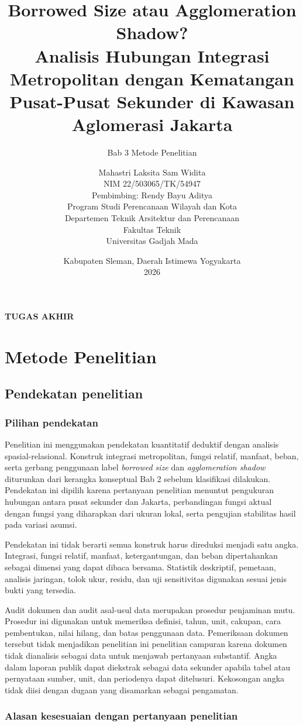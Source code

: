 \documentclass[11pt,a4paper,oneside,openany,indonesian]{report}
\title{\textbf{Borrowed Size atau Agglomeration Shadow?}\\[0.4em]
Analisis Hubungan Integrasi Metropolitan dengan Kematangan Pusat-Pusat Sekunder di Kawasan Aglomerasi Jakarta}
\subtitle{Bab 3 Metode Penelitian}
\author{Mahastri Laksita Sam Widita\\NIM 22/503065/TK/54947\\[0.5em]
Pembimbing: Rendy Bayu Aditya\\[0.5em]
Program Studi Perencanaan Wilayah dan Kota\\
Departemen Teknik Arsitektur dan Perencanaan\\
Fakultas Teknik\\
Universitas Gadjah Mada}
\date{Kabupaten Sleman, Daerah Istimewa Yogyakarta\\2026}
\makeatletter
\renewcommand{\maketitle}{%
  \begin{titlepage}
    \centering
    {\Large\bfseries TUGAS AKHIR\par}
    \vfill
    {\LARGE\bfseries \@title\par}
    \vspace{1.2cm}
    {\large \thesubtitle\par}
    \vfill
    {\large \@author\par}
    \vfill
    {\large \@date\par}
  \end{titlepage}}
\makeatother
\begin{document}
\maketitle
\tableofcontents
\clearpage
\setcounter{chapter}{2}
\chapter{Metode Penelitian}
\section{Pendekatan penelitian}\label{pendekatan-penelitian}

\subsection{Pilihan pendekatan}\label{pilihan-pendekatan}

Penelitian ini menggunakan pendekatan kuantitatif deduktif dengan
analisis spasial-relasional. Konstruk integrasi metropolitan,
fungsi relatif, manfaat, beban, serta gerbang penggunaan label
\emph{borrowed size} dan \emph{agglomeration shadow} diturunkan dari
kerangka konseptual Bab 2 sebelum klasifikasi dilakukan. Pendekatan ini
dipilih karena pertanyaan penelitian menuntut pengukuran hubungan antara
pusat sekunder dan Jakarta, perbandingan fungsi aktual dengan fungsi
yang diharapkan dari ukuran lokal, serta pengujian stabilitas hasil pada
variasi asumsi.

Pendekatan ini tidak berarti semua konstruk harus direduksi menjadi satu
angka. Integrasi, fungsi relatif, manfaat, ketergantungan, dan beban
dipertahankan sebagai dimensi yang dapat dibaca bersama. Statistik
deskriptif, pemetaan, analisis jaringan, tolok ukur, residu, dan uji
sensitivitas digunakan sesuai jenis bukti yang tersedia.

Audit dokumen dan audit asal-usul data merupakan prosedur penjaminan
mutu. Prosedur ini digunakan untuk memeriksa definisi, tahun, unit,
cakupan, cara pembentukan, nilai hilang, dan batas penggunaan data.
Pemeriksaan dokumen tersebut tidak menjadikan penelitian ini penelitian
campuran karena dokumen tidak dianalisis sebagai data untuk menjawab
pertanyaan substantif. Angka dalam laporan publik dapat diekstrak sebagai
data sekunder apabila tabel atau pernyataan sumber, unit, dan periodenya
dapat ditelusuri. Kekosongan angka tidak diisi dengan dugaan yang
disamarkan sebagai pengamatan.

\subsection{Alasan kesesuaian dengan pertanyaan
penelitian}\label{alasan-kesesuaian-dengan-pertanyaan-penelitian}
\end{document}
